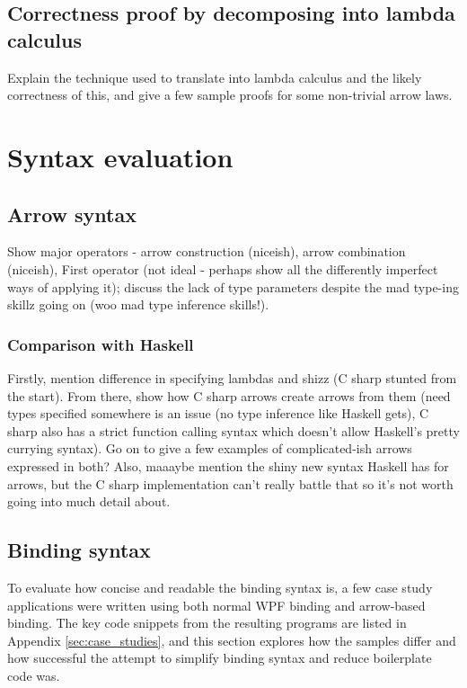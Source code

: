 \documentclass[12pt,twoside,notitlepage]{report}
\begin{document}
\subsection{Correctness proof by decomposing into lambda calculus}

Explain the technique used to translate into lambda calculus and the likely correctness of this, and give a few sample proofs for some non-trivial arrow laws.

\section{Syntax evaluation}

\subsection{Arrow syntax}

Show major operators - arrow construction (niceish), arrow combination (niceish), First operator (not ideal - perhaps show all the differently imperfect ways of applying it); discuss the lack of type parameters despite the mad type-ing skillz going on (woo mad type inference skills!).

\subsubsection{Comparison with Haskell}

Firstly, mention difference in specifying lambdas and shizz (C sharp stunted from the start). From there, show how C sharp arrows create arrows from them (need types specified somewhere is an issue (no type inference like Haskell gets), C sharp also has a strict function calling syntax which doesn't allow Haskell's pretty currying syntax). Go on to give a few examples of complicated-ish arrows expressed in both? Also, maaaybe mention the shiny new syntax Haskell has for arrows, but the C sharp implementation can't really battle that so it's not worth going into much detail about.

\subsection{Binding syntax}

To evaluate how concise and readable the binding syntax is, a few case study applications were written using both normal WPF binding and arrow-based binding. The key code snippets from the resulting programs are listed in Appendix \ref{sec:case_studies}, and this section explores how the samples differ and how successful the attempt to simplify binding syntax and reduce boilerplate code was.
\end{document}
